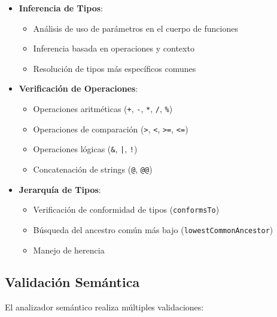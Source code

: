 \documentclass[11pt, a4paper, twoside]{article} %
\begin{document}
\begin{itemize}
    \item \textbf{Inferencia de Tipos}:
    \begin{itemize}
        \item Análisis de uso de parámetros en el cuerpo de funciones
        \item Inferencia basada en operaciones y contexto
        \item Resolución de tipos más específicos comunes
    \end{itemize}

    \item \textbf{Verificaci\'on de Operaciones}:
    \begin{itemize}
        \item Operaciones aritméticas (\texttt{+}, \texttt{-}, \texttt{*}, \texttt{/}, \texttt{\%})
        \item Operaciones de comparación (\texttt{>}, \texttt{<}, \texttt{>=}, \texttt{<=})
        \item Operaciones lógicas (\texttt{\&}, \texttt{|}, \texttt{!})
        \item Concatenación de strings (\texttt{@}, \texttt{@@})
    \end{itemize}

    \item \textbf{Jerarqu\'ia de Tipos}:
    \begin{itemize}
        \item Verificación de conformidad de tipos (\texttt{conformsTo})
        \item Búsqueda del ancestro común más bajo (\texttt{lowestCommonAncestor})
        \item Manejo de herencia
    \end{itemize}
\end{itemize}

\subsection{Validaci\'on Sem\'antica}

El analizador semántico realiza múltiples validaciones:
\end{document}
